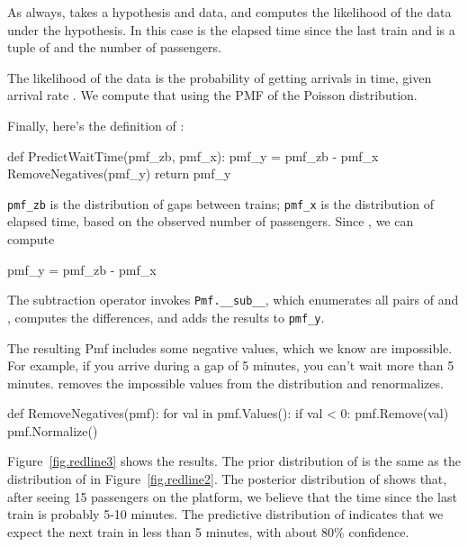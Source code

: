 \documentclass[12pt]{book}
\theoremstyle{exercise}
\begin{document}
As always,  takes a hypothesis and data, and
computes the likelihood of the data under the hypothesis.
In this case  is the elapsed time since the last train
and  is a tuple of  and the number of
passengers.

The likelihood of the data is the probability of getting
 arrivals in  time, given arrival rate
.  We compute that using the PMF of the Poisson
distribution.

Finally, here's the definition of :

\begin{code}
def PredictWaitTime(pmf_zb, pmf_x):
    pmf_y = pmf_zb - pmf_x
    RemoveNegatives(pmf_y)
    return pmf_y
\end{code}

\verb"pmf_zb" is the distribution of gaps between trains;
\verb"pmf_x" is the distribution of elapsed time, based on
the observed number of passengers.  Since ,
we can compute

\begin{code}
    pmf_y = pmf_zb - pmf_x
\end{code}

The subtraction operator invokes \verb"Pmf.__sub__", which enumerates
all pairs of  and , computes the differences, and adds
the results to \verb"pmf_y".

The resulting Pmf includes some negative values, which we know are
impossible.  For example, if you arrive during a gap of 5 minutes, you
can't wait more than 5 minutes.   removes the
impossible values from the distribution and renormalizes.

\begin{code}
def RemoveNegatives(pmf):
    for val in pmf.Values():
        if val < 0:
            pmf.Remove(val)
    pmf.Normalize()
\end{code}

Figure~\ref{fig.redline3} shows the results.  The prior distribution
of  is the same as the distribution of  in
Figure~\ref{fig.redline2}.  The posterior distribution of 
shows that, after seeing 15 passengers on the platform, we believe
that the time since the last train is probably 5-10 minutes.  The
predictive distribution of  indicates that we expect the next
train in less than 5 minutes, with about 80\% confidence.
\end{document}
